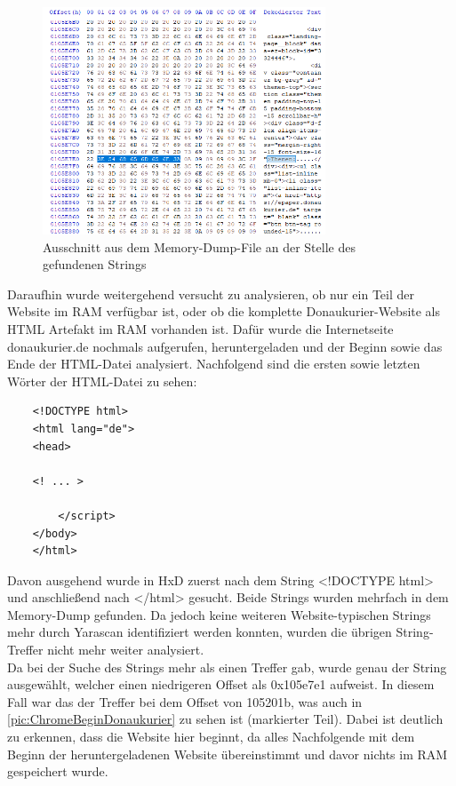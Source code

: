 \begin{figure}[h!]
	\centering
	\includegraphics[width=0.75\textwidth]{bilder/HxDChromeStringThemen.png}
	\caption{Ausschnitt aus dem Memory-Dump-File an der Stelle des gefundenen Strings}
	\label{pic:ChromeStringThemen}
\end{figure} 

Daraufhin wurde weitergehend versucht zu analysieren, ob nur ein Teil der Website im RAM verfügbar ist, oder ob die komplette Donaukurier-Website als HTML Artefakt im RAM vorhanden ist. Dafür wurde die Internetseite donaukurier.de nochmals aufgerufen, heruntergeladen und der Beginn sowie das Ende der HTML-Datei analysiert. Nachfolgend sind die ersten sowie letzten Wörter der HTML-Datei zu sehen:\\

\begin{verbatim}
	<!DOCTYPE html>
	<html lang="de">
	<head>
	
	<! ... >
	
	    </script>
	</body>
	</html>
\end{verbatim}

Davon ausgehend wurde in HxD zuerst nach dem String \glqq{}<!DOCTYPE html>\grqq{} und anschließend nach \glqq{}</html>\grqq{} gesucht. Beide Strings wurden mehrfach in dem Memory-Dump gefunden. Da jedoch keine weiteren Website-typischen Strings mehr durch Yarascan identifiziert werden konnten, wurden die übrigen String-Treffer nicht mehr weiter analysiert.\\
Da bei der Suche des Strings mehr als einen Treffer gab, wurde genau der String ausgewählt, welcher einen niedrigeren Offset als 0x105e7e1 aufweist. In diesem Fall war das der Treffer bei dem Offset von 105201b, was auch in \autoref{pic:ChromeBeginDonaukurier} zu sehen ist (markierter Teil). Dabei ist deutlich zu erkennen, dass die Website hier beginnt, da alles Nachfolgende mit dem Beginn der heruntergeladenen Website übereinstimmt und davor nichts im RAM gespeichert wurde.

